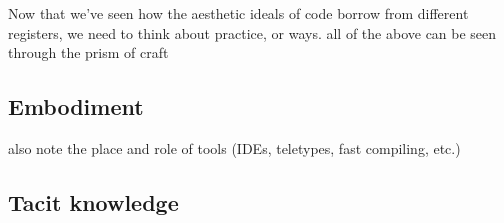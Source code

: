 Now that we've seen how the aesthetic ideals of code borrow from different registers, we need to think about practice, or ways. all of the above can be seen through the prism of craft

\subsection{Embodiment}

also note the place and role of tools (IDEs, teletypes, fast compiling, etc.)

\subsection{Tacit knowledge}

